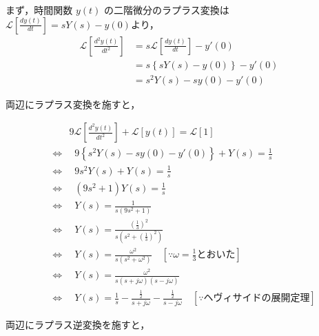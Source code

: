 \documentclass[a4paper,12pt]{article}
\begin{document}
\begin{tcolorbox}[title={[8] 次の微分方程式をラプラス変換を用いて解け.
\[
    9 \frac{d^2 y(t)}{dt^2} + y(t) = 1 
\]
\quad ただし，初期値は，$y(0) = 0,\ y'(0) = 0$ とする．
}]

\quad まず，時間関数 \( y(t) \) の二階微分のラプラス変換は\( \mathcal{L} \left[ \frac{dy(t)}{dt} \right] = sY(s) - y(0) \)より，
    \vspace{-3mm}
    \begin{align*}
        \mathcal{L} \left[ \frac{d^2y(t)}{dt^2} \right] 
        &= s \mathcal{L} \left[ \frac{dy(t)}{dt} \right] - y'(0) \\
        &= s \left\{ sY(s) - y(0) \right\} - y'(0) \\
        &= s^2 Y(s) - s y(0) - y'(0)
    \end{align*}


\newpage

\quad 両辺にラプラス変換を施すと，

\vspace{-6mm}

\begin{align*}
    &\qquad 9 \mathcal{L} \left[ \frac{d^2 y(t)}{dt^2} \right] + \mathcal{L}[y(t)] = \mathcal{L}[1] \\
    &\Leftrightarrow \quad 9\left\{s^2 Y(s) - s y(0) - y'(0)\right\} + Y(s) = \frac{1}{s} \\
    &\Leftrightarrow \quad 9s^2 Y(s) + Y(s) = \frac{1}{s} \\
    &\Leftrightarrow \quad (9s^2 + 1) Y(s) = \frac{1}{s} \\
    &\Leftrightarrow \quad Y(s) = \frac{1}{s(9s^2 + 1)} \\
    &\Leftrightarrow \quad Y(s)= \frac{(\frac{1}{3})^2}{s(s^2 + \left( \frac{1}{3} \right)^2)} \\
    &\Leftrightarrow \quad Y(s)= \frac{\omega^2}{s(s^2 + \omega^2)} \quad \left[\because \omega = \frac{1}{3} \text{とおいた}\right]\\
    &\Leftrightarrow \quad Y(s)= \frac{\omega^2}{s(s + j \omega)(s - j \omega)} \\
    &\Leftrightarrow \quad Y(s)= \frac{1}{s} - \frac{\frac{1}{2}}{s + j \omega} - \frac{\frac{1}{2}}{s - j \omega} \quad \left[ \because ヘヴィサイドの展開定理 \right]
\end{align*}

\quad 両辺にラプラス逆変換を施すと，

\vspace{-6mm}


\end{tcolorbox}
\end{document}

